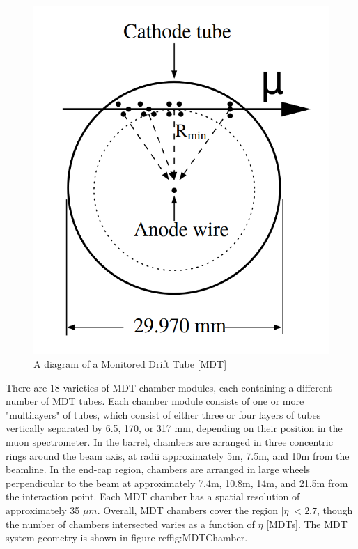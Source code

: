 \begin{figure}
  \includegraphics[width=\linewidth]{figures/detector_chapter/MDT.png}
  \caption{A diagram of a Monitored Drift Tube \ref{MDT}}
  \label{fig:MDT}
\end{figure}

There are 18 varieties of MDT chamber modules, each containing a different number of MDT tubes. Each chamber module consists of one or more "multilayers" of tubes, which consist of either three or four layers of tubes vertically separated by 6.5, 170, or 317 mm, depending on their position in the muon spectrometer. In the barrel, chambers are arranged in three concentric rings around the beam axis, at radii approximately 5m, 7.5m, and 10m from the beamline. In the end-cap region, chambers are arranged in large wheels perpendicular to the beam at approximately 7.4m, 10.8m, 14m, and 21.5m from the interaction point. Each MDT chamber has a spatial resolution of approximately 35 $\mu m$. Overall, MDT chambers cover the region $ |\eta | < 2.7$, though the number of chambers intersected varies as a function of $\eta$ \ref{MDTs}. The MDT system geometry is shown in figure ref{fig:MDTChamber}. 

